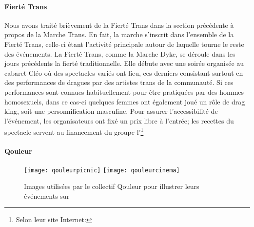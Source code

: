 \paragraph{Fierté Trans}
\label{subsec:fiertetrans}

Nous avons traité brièvement de la Fierté Trans dans la section précédente à propos de la Marche Trans.
En fait, la marche s'inscrit dans l'ensemble de la Fierté Trans, celle-ci étant l'activité principale autour de laquelle tourne le reste des événements.
La Fierté Trans, comme la Marche Dyke, se déroule dans les jours précédents la fierté traditionnelle.
Elle débute avec une soirée organisée au cabaret Cléo où des spectacles variés ont lieu, ces derniers consistant surtout en des performances de dragues par des artistes trans de la communauté.
Si ces performances sont connues habituellement pour être pratiquées par des hommes homosexuels, dans ce cas-ci quelques femmes ont également joué un rôle de drag king, soit une personnification masculine.
Pour assurer l'accessibilité de l'événement, les organisateurs ont fixé un prix libre à l'entrée; les recettes du spectacle servent au financement du groupe l'\astteq{}\footnote{Selon leur site Internet: }

\paragraph{Qouleur}
\label{subsec:qouleur}

\begin{figure}
 \centering
 {\texttt{[image: qouleurpicnic]}}
 {\texttt{[image: qouleurcinema]}}
 \caption[Exemples d'images utilisées par Qouleur]{Images utilisées par le collectif Qouleur pour illustrer leurs événements sur }\label{figs:qouleurcinema}
\end{figure}

